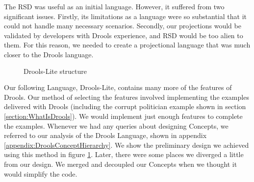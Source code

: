 The RSD was useful as an initial language. 
However, it suffered from two significant issues.
Firstly, its limitations as a language were so substantial that it could not handle many necessary scenarios.
Secondly, our projections would be validated by developers with Drools experience, and RSD would be too alien to them.
For this reason, we needed to create a projectional language that was much closer to the Drools language.

\begin{figure}
    \centering
    \caption{Drools-Lite structure}
    \label{fig:DroolsLiteDiagram}
\end{figure}
 
Our following Language, Drools-Lite, contains many more of the features of Drools.
Our method of selecting the features involved implementing the examples delivered with Drools (including the corrupt politician example shown in section \ref{section:WhatIsDrools}).
We would implement just enough features to complete the examples.
Whenever we had any queries about designing Concepts, we referred to our analysis of the Drools Language, shown in appendix \ref{appendix:DroolsConceptHierarchy}.
We show the preliminary design we achieved using this method in figure \ref{fig:DroolsLiteDiagram}.
Later, there were some places we diverged a little from our design.
We merged and decoupled our Concepts when we thought it would simplify the code.

